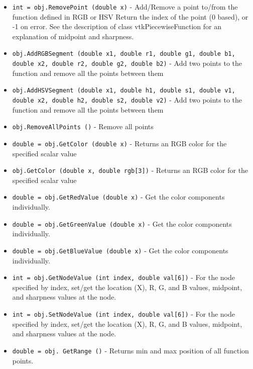 \begin{itemize}
\item  \verb|int = obj.RemovePoint (double x)| -  Add/Remove a point to/from the function defined in RGB or HSV
 Return the index of the point (0 based), or -1 on error.
 See the description of class vtkPiecewiseFunction for an explanation of
 midpoint and sharpness.

\item  \verb|obj.AddRGBSegment (double x1, double r1, double g1, double b1, double x2, double r2, double g2, double b2)| -  Add two points to the function and remove all the points 
 between them

\item  \verb|obj.AddHSVSegment (double x1, double h1, double s1, double v1, double x2, double h2, double s2, double v2)| -  Add two points to the function and remove all the points 
 between them

\item  \verb|obj.RemoveAllPoints ()| -  Remove all points

\item  \verb|double = obj.GetColor (double x)| -  Returns an RGB color for the specified scalar value 

\item  \verb|obj.GetColor (double x, double rgb[3])| -  Returns an RGB color for the specified scalar value 

\item  \verb|double = obj.GetRedValue (double x)| -  Get the color components individually.

\item  \verb|double = obj.GetGreenValue (double x)| -  Get the color components individually.

\item  \verb|double = obj.GetBlueValue (double x)| -  Get the color components individually.

\item  \verb|int = obj.GetNodeValue (int index, double val[6])| -  For the node specified by index, set/get the
 location (X), R, G, and B values, midpoint, and 
 sharpness values at the node.

\item  \verb|int = obj.SetNodeValue (int index, double val[6])| -  For the node specified by index, set/get the
 location (X), R, G, and B values, midpoint, and 
 sharpness values at the node.

\item  \verb|double = obj. GetRange ()| -  Returns min and max position of all function points.


\end{itemize}
